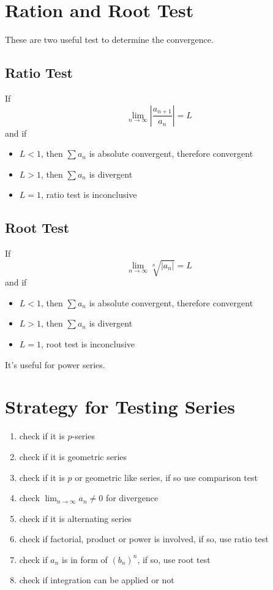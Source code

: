 \documentclass[10pt,a4paper,oneside]{article}
\begin{document}
\section{Ration and Root Test}
These are two useful test to determine the convergence.

\subsection{Ratio Test}
If
\[
\lim_{n \rightarrow \infty} \left| \frac{a_{n+1}}{a_n} \right| = L
\]
and if
\begin{itemize}
	\item $L < 1$, then $\sum a_n$ is absolute convergent, therefore convergent
	\item $L > 1$, then $\sum a_n$ is divergent
	\item $L = 1$, ratio test is inconclusive
\end{itemize}

\subsection{Root Test}
If
\[
\lim_{n \rightarrow \infty} \sqrt[n]{|a_n|} = L
\]
and if
\begin{itemize}
	\item $L < 1$, then $\sum a_n$ is absolute convergent, therefore convergent
	\item $L > 1$, then $\sum a_n$ is divergent
	\item $L = 1$, root test is inconclusive
\end{itemize}
It's useful for power series.

\section{Strategy for Testing Series}
\begin{enumerate}
	\item check if it is $p$-series
	\item check if it is geometric series
	\item check if it is $p$ or geometric like series, if so use comparison test
	\item check $\lim_{n \rightarrow \infty} a_n \neq 0$ for divergence
	\item check if it is alternating series
	\item check if factorial, product or power is involved, if so, use ratio test
	\item check if $a_n$ is in form of $(b_n)^n$, if so, use root test
	\item check if integration can be applied or not
\end{enumerate}
\end{document}
